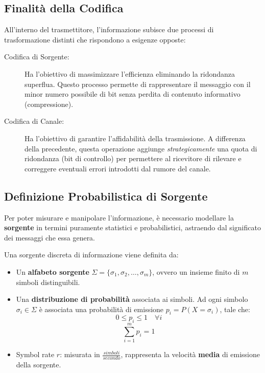 \subsection{Finalità della Codifica}
All'interno del trasmettitore, l'informazione subisce due processi di trasformazione distinti che rispondono a esigenze opposte:

\begin{description}
    \item[Codifica di Sorgente:] Ha l'obiettivo di massimizzare l'efficienza eliminando la ridondanza superflua. Questo processo permette di rappresentare il messaggio con il minor numero possibile di bit senza perdita di contenuto informativo (compressione).
    
    \item[Codifica di Canale:] Ha l'obiettivo di garantire l'affidabilità della trasmissione. A differenza della precedente, questa operazione aggiunge \textit{strategicamente} una quota di ridondanza (bit di controllo) per permettere al ricevitore di rilevare e correggere eventuali errori introdotti dal rumore del canale.
\end{description}



\subsection{Definizione Probabilistica di Sorgente}
Per poter misurare e manipolare l'informazione, è necessario modellare la \textbf{sorgente} in termini puramente statistici e probabilistici, astraendo dal significato dei messaggi che essa genera. 

Una sorgente discreta di informazione viene definita da:
\begin{itemize}
    \item Un \textbf{alfabeto sorgente} $\Sigma = \{\sigma_1, \sigma_2, \dots, \sigma_m\}$, ovvero un insieme finito di $m$ simboli distinguibili.
    \item Una \textbf{distribuzione di probabilità} associata ai simboli. Ad ogni simbolo $\sigma_i \in \Sigma$ è associata una probabilità di emissione $p_i = P(X = \sigma_i)$, tale che:
    \[ 0 \le p_i \le 1 \quad \forall i \]
    \[ \sum_{i=1}^{m} p_i = 1 \]

    \item Symbol rate $r$: misurata in $\frac{simboli}{secondo}$, rappresenta la velocità \textbf{media} di emissione della sorgente.
\end{itemize}

